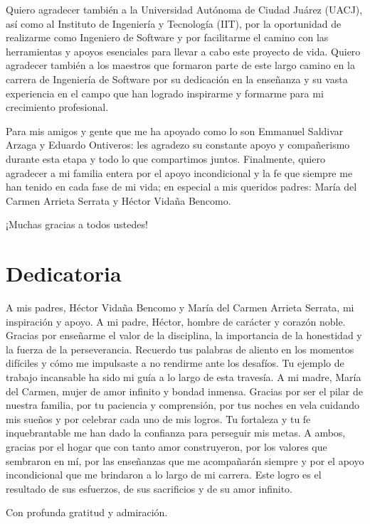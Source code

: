 \documentclass[final, fmstyle, 12pt]{article}
\begin{document}
Quiero agradecer también a la Universidad Autónoma de Ciudad Juárez (UACJ), así como al Instituto de Ingeniería y Tecnología (IIT), por la oportunidad de realizarme como Ingeniero de Software y por facilitarme el camino con las herramientas y apoyos esenciales para llevar a cabo este proyecto de vida.
Quiero agradecer también a los maestros que formaron parte de este largo camino en la carrera de Ingeniería de Software por su dedicación en la enseñanza y su vasta experiencia en el campo que han logrado inspirarme y formarme para mi crecimiento profesional.

Para mis amigos y gente que me ha apoyado como lo son Emmanuel Saldivar Arzaga y Eduardo Ontiveros: les agradezo su constante apoyo y compañerismo durante esta etapa y todo lo que compartimos juntos.
Finalmente, quiero agradecer a mi familia entera por el apoyo incondicional y la fe que siempre me han tenido en cada fase de mi vida; en especial a mis queridos padres: María del Carmen Arrieta Serrata y Héctor Vidaña Bencomo.




¡Muchas gracias a todos ustedes!
\newpage
\section*{Dedicatoria}
\setlength{\parskip}{1em}
A mis padres, Héctor Vidaña Bencomo y María del Carmen Arrieta Serrata, mi inspiración y apoyo.
A mi padre, Héctor, hombre de carácter y corazón noble. Gracias por enseñarme el valor de la disciplina, la importancia de la honestidad y la fuerza de la perseverancia. Recuerdo tus palabras de aliento en los momentos difíciles y cómo me impulsaste a no rendirme ante los desafíos. Tu ejemplo de trabajo incansable ha sido mi guía a lo largo de esta travesía.
A mi madre, María del Carmen, mujer de  amor infinito y  bondad inmensa. Gracias por ser el pilar de nuestra familia, por tu paciencia y comprensión, por tus noches en vela cuidando mis sueños y por celebrar cada uno de mis logros.  Tu fortaleza y tu fe inquebrantable me han dado la confianza para perseguir mis metas.
A ambos, gracias por el hogar que con tanto amor construyeron, por los valores que sembraron en mí, por las enseñanzas que me acompañarán siempre y por el apoyo incondicional que me brindaron a lo largo de mi carrera. Este logro es el resultado de sus esfuerzos, de sus sacrificios y de su amor infinito.


Con profunda gratitud y admiración.
\newpage
\tableofcontents 

\newpage
\end{document}
